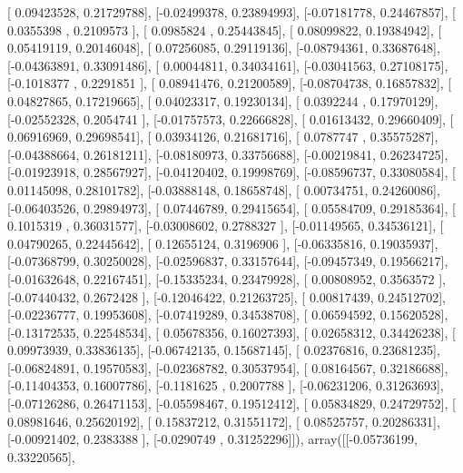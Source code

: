 \documentclass{article}
\begin{document}
       [ 0.09423528,  0.21729788],
       [-0.02499378,  0.23894993],
       [-0.07181778,  0.24467857],
       [ 0.0355398 ,  0.2109573 ],
       [ 0.0985824 ,  0.25443845],
       [ 0.08099822,  0.19384942],
       [ 0.05419119,  0.20146048],
       [ 0.07256085,  0.29119136],
       [-0.08794361,  0.33687648],
       [-0.04363891,  0.33091486],
       [ 0.00044811,  0.34034161],
       [-0.03041563,  0.27108175],
       [-0.1018377 ,  0.2291851 ],
       [ 0.08941476,  0.21200589],
       [-0.08704738,  0.16857832],
       [ 0.04827865,  0.17219665],
       [ 0.04023317,  0.19230134],
       [ 0.0392244 ,  0.17970129],
       [-0.02552328,  0.2054741 ],
       [-0.01757573,  0.22666828],
       [ 0.01613432,  0.29660409],
       [ 0.06916969,  0.29698541],
       [ 0.03934126,  0.21681716],
       [ 0.0787747 ,  0.35575287],
       [-0.04388664,  0.26181211],
       [-0.08180973,  0.33756688],
       [-0.00219841,  0.26234725],
       [-0.01923918,  0.28567927],
       [-0.04120402,  0.19998769],
       [-0.08596737,  0.33080584],
       [ 0.01145098,  0.28101782],
       [-0.03888148,  0.18658748],
       [ 0.00734751,  0.24260086],
       [-0.06403526,  0.29894973],
       [ 0.07446789,  0.29415654],
       [ 0.05584709,  0.29185364],
       [ 0.1015319 ,  0.36031577],
       [-0.03008602,  0.2788327 ],
       [-0.01149565,  0.34536121],
       [ 0.04790265,  0.22445642],
       [ 0.12655124,  0.3196906 ],
       [-0.06335816,  0.19035937],
       [-0.07368799,  0.30250028],
       [-0.02596837,  0.33157644],
       [-0.09457349,  0.19566217],
       [-0.01632648,  0.22167451],
       [-0.15335234,  0.23479928],
       [ 0.00808952,  0.3563572 ],
       [-0.07440432,  0.2672428 ],
       [-0.12046422,  0.21263725],
       [ 0.00817439,  0.24512702],
       [-0.02236777,  0.19953608],
       [-0.07419289,  0.34538708],
       [ 0.06594592,  0.15620528],
       [-0.13172535,  0.22548534],
       [ 0.05678356,  0.16027393],
       [ 0.02658312,  0.34426238],
       [ 0.09973939,  0.33836135],
       [-0.06742135,  0.15687145],
       [ 0.02376816,  0.23681235],
       [-0.06824891,  0.19570583],
       [-0.02368782,  0.30537954],
       [ 0.08164567,  0.32186688],
       [-0.11404353,  0.16007786],
       [-0.1181625 ,  0.2007788 ],
       [-0.06231206,  0.31263693],
       [-0.07126286,  0.26471153],
       [-0.05598467,  0.19512412],
       [ 0.05834829,  0.24729752],
       [ 0.08981646,  0.25620192],
       [ 0.15837212,  0.31551172],
       [ 0.08525757,  0.20286331],
       [-0.00921402,  0.2383388 ],
       [-0.0290749 ,  0.31252296]]), array([[-0.05736199,  0.33220565],
\end{document}
